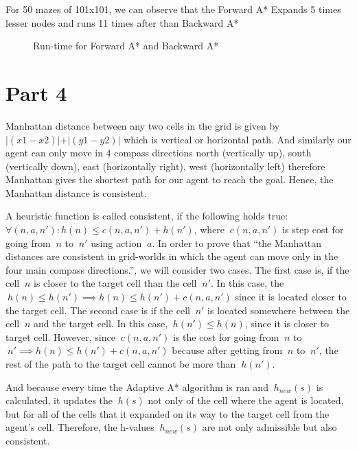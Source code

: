 \documentclass{article}
\begin{document}
For 50 mazes of 101x101, we can observe that the Forward A* Expands 5 times lesser nodes and runs 11 times after than Backward A*  

\begin{figure}[!ht]
    \centering
    \caption{Run-time for Forward A* and Backward A*}
    \label{fig:my_label}
\end{figure}

\section*{Part 4}

Manhattan distance between any two cells in the grid is given by ${|(x1 - x2)}| + |{(y1 - y2)|}$ which is vertical or horizontal path. And similarly our agent can only move in 4 compass directions north (vertically up), south (vertically down), east (horizontally right), west (horizontally left) therefore Manhattan gives the shortest path for our agent to reach the goal. Hence, the Manhattan distance is consistent.

A heuristic function is called consistent, if the following holds true: $\forall (n,a,n'): h (n)\leq c(n,a,n')+h(n')$, where $\ c(n,a,n')$ is step cost for going from $\ n$ to $\ n'$ using action $\ a$. In order to prove that “the Manhattan distances are consistent in grid-worlds in which the agent can move only in the four main compass directions.”, we will consider two cases. The first case is, if the cell $\ n$ is closer to the target cell than the cell $\ n'$. In this case, the $\ h(n) \leq h(n') \implies h(n) \leq h(n')+c(n,a,n')$ since it is located closer to the target cell. The second case is if the cell $\ n'$ is located somewhere between the cell $\ n$ and the target cell. In this case, $\ h(n') \leq h(n)$, since it is closer to target cell. However, since $\ c(n,a,n')$ is the cost for going from $\ n$ to $\ n' \implies h(n) \leq h(n')+c(n,a,n')$ because after getting from $\ n$ to $\ n'$, the rest of the path to the target cell cannot be more than $\ h(n')$.

And because every time the Adaptive A* algorithm is ran and $\ h_{new}(s)$ is calculated, it updates the $\ h(s)$ not only of the cell where the agent is located, but for all of the cells that it expanded on its way to the target cell from the agent's cell. Therefore, the h-values $\ h_{new}(s)$ are not only admissible but also consistent.\cite{1}
\end{document}
